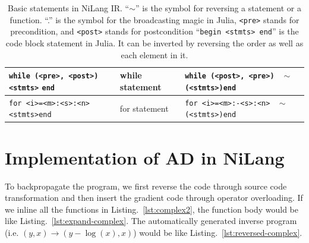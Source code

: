\documentclass{article}
\newcommand{\<}{\langle}
\renewcommand{\>}{\rangle}
\newcommand{\cquad}{{{ }_{\quad}}}
\newcommand{\Lst}[1]{Listing.~\ref{#1}}
\theoremstyle{definition}\newtheorem{definition}{\textit{Definition}}
\begin{document}
\begin{table}[h!]
\begin{minipage}{\columnwidth}
{\begin{tabularx}{\textwidth}{X X X}
            \hline
            \texttt{while (<pre>, <post>)}\newline \texttt{$\cquad$<stmts>} \newline \texttt{end} & while statement & \texttt{while (<post>, <pre>)}\newline $\cquad$  \texttt{$\sim$(<stmts>)}\newline \texttt{end}\\
            \hline
            \texttt{for <i>=<m>:<s>:<n>}\newline $\cquad$\texttt{<stmts>}\newline \texttt{end} & for statement & \texttt{for <i>=<m>:-<s>:<n>}\newline $\cquad$ \texttt{$\sim$(<stmts>)}\newline \texttt{end}\\
            \bottomrule
        \end{tabularx}
    }
    \caption{Basic statements in NiLang IR.
    ``$\sim$'' is the symbol for reversing a statement or a function.
    ``.'' is the symbol for the broadcasting magic in Julia,
    \texttt{<pre>} stands for precondition, and \texttt{<post>} stands for postcondition
``\texttt{begin <stmts> end}'' is the code block statement in Julia.
It can be inverted by reversing the order as well as each element in it.
}\label{tbl:revstatements}
\end{minipage}
\end{table}

\section{Implementation of AD in NiLang}\label{app:jacobian}
To backpropagate the program, we first reverse the code through source code transformation and then insert the gradient code through operator overloading.
If we inline all the functions in \Lst{lst:complex2}, the function body would be like \Lst{lst:expand-complex}.
The automatically generated inverse program (i.e. $(y, x) \rightarrow (y-\log(x), x)$) would be like \Lst{lst:reversed-complex}.
\end{document}
